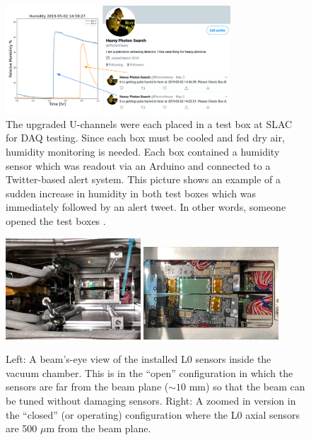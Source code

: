 \begin{figure}
    \centering
    \includegraphics[width=0.75\textwidth]{figs/upgrades/twitter.png}
    \caption{The upgraded U-channels were each placed in a test box at SLAC for DAQ testing. Since each box must be cooled and fed dry air, humidity monitoring is needed. Each box contained a humidity sensor which was readout via an Arduino and connected to a Twitter-based alert system. This picture shows an example of a sudden increase in humidity in both test boxes which was immediately followed by an alert tweet. In other words, someone opened the test boxes \cite{hpstweet2019}.}
    \label{fig:twitter}
\end{figure}

\begin{figure}
    \centering
    \includegraphics[width=0.45\textwidth]{figs/upgrades/SVT_L0_open.png}
    \includegraphics[width=0.45\textwidth]{figs/upgrades/SVT_L0_closed.png}
    \caption{Left: A beam's-eye view of the installed L0 sensors inside the vacuum chamber. This is in the ``open'' configuration in which the sensors are far from the beam plane ($\sim 10$ mm) so that the beam can be tuned without damaging sensors. Right: A zoomed in version in the ``closed'' (or operating) configuration where the L0 axial sensors are 500 $\mu$m from the beam plane. }
    \label{fig:SVTview}
\end{figure}

